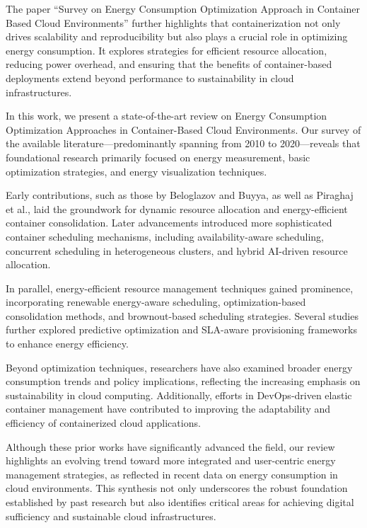\begin{multicols}{2}
The paper ``Survey on Energy Consumption Optimization Approach in Container Based Cloud Environments'' 
further highlights that containerization not only drives scalability and 
reproducibility but also plays a crucial role in optimizing energy consumption. It 
explores strategies for efficient resource allocation, reducing power overhead, and 
ensuring that the benefits of container-based deployments extend beyond performance 
to sustainability in cloud infrastructures.

In this work, we present a state-of-the-art review on Energy Consumption Optimization Approaches in Container-Based Cloud Environments. Our survey of the available literature—predominantly spanning from 2010 to 2020—reveals that foundational research primarily focused on energy measurement, basic optimization strategies, and energy visualization techniques\cite{beloglazov_energy_2010}.

Early contributions, such as those by Beloglazov and Buyya\cite{beloglazov_energy_2010}, as well as 
Piraghaj et al.\cite{piraghaj_framework_2015}, laid the groundwork for dynamic resource allocation and 
energy-efficient container consolidation. Later advancements introduced more sophisticated container 
scheduling mechanisms, including availability-aware scheduling\cite{alahmad_availability-aware_2018}, 
concurrent scheduling in heterogeneous clusters\cite{hu_concurrent_2020}, and hybrid AI-driven resource 
allocation\cite{tan_hybrid_2019}.

In parallel, energy-efficient resource management techniques gained prominence, incorporating renewable 
energy-aware scheduling\cite{kumar_renewable_2019}, optimization-based consolidation methods\cite{shi_energy-aware_2018, piraghaj_framework_2015}, 
and brownout-based scheduling strategies\cite{xu_energy_2016}. Several studies further explored 
predictive optimization and SLA-aware provisioning frameworks to enhance energy 
efficiency\cite{dabbagh_energy-efficient_2015, hameed_survey_2016, li_sla-aware_2018, bui_energy_2017, 
carrega_energy-aware_2017}.

Beyond optimization techniques, researchers have also examined broader energy consumption trends and policy implications\cite{avgerinou_trends_2017}, reflecting the increasing emphasis on sustainability in cloud computing. Additionally, efforts in DevOps-driven elastic container management have contributed to improving the adaptability and efficiency of containerized cloud applications\cite{barna_delivering_2017}.

Although these prior works have significantly advanced the field, our review highlights an evolving trend toward more integrated and user-centric energy management strategies, as reflected in recent data on energy consumption in cloud environments\cite{masanet_2020, hintemann_2022, IEADataCentres}. This synthesis not only underscores the robust foundation established by past research but also identifies critical areas for achieving digital sufficiency and sustainable cloud infrastructures.

\end{multicols}

\newpage